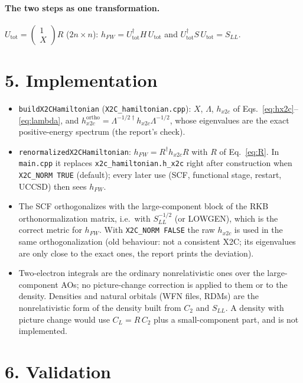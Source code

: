 \documentclass[11pt]{article}
\newcommand{\dg}{^{\dagger}}
\begin{document}
\paragraph{The two steps as one transformation.}
$U_{\text{tot}} = \begin{pmatrix}1\\X\end{pmatrix}R$ ($2n\times n$): $h_{FW}=U_{\text{tot}}\dg H\,U_{\text{tot}}$ and
$U_{\text{tot}}\dg S\,U_{\text{tot}} = S_{LL}$.

\section*{5. Implementation}

\begin{itemize}
\item \texttt{buildX2CHamiltonian} (\texttt{X2C\_hamiltonian.cpp}): $X$, $\Lambda$, $h_{x2c}$ of
Eqs.~\eqref{eq:hx2c}--\eqref{eq:lambda}, and $h^{\text{ortho}}_{x2c}=\Lambda^{-1/2\dagger}h_{x2c}\Lambda^{-1/2}$, whose
eigenvalues are the exact positive-energy spectrum (the report's check).
\item \texttt{renormalizedX2CHamiltonian}: $h_{FW}=R\dg h_{x2c}R$ with $R$ of Eq.~\eqref{eq:R}. In \texttt{main.cpp} it
replaces \texttt{x2c\_hamiltonian.h\_x2c} right after construction when \texttt{X2C\_NORM TRUE} (default); every later
use (SCF, functional stage, restart, UCCSD) then sees $h_{FW}$.
\item The SCF orthogonalizes with the large-component block of the RKB orthonormalization matrix, i.e.\ with
$S_{LL}^{-1/2}$ (or LOWGEN), which is the correct metric for $h_{FW}$. With \texttt{X2C\_NORM FALSE} the raw $h_{x2c}$ is used
in the same orthogonalization (old behaviour: not a consistent X2C; its eigenvalues are only close to the exact ones,
the report prints the deviation).
\item Two-electron integrals are the ordinary nonrelativistic ones over the large-component AOs; no picture-change
correction is applied to them or to the density. Densities and natural orbitals (WFN files, RDMs) are the
nonrelativistic form of the density built from $C_2$ and $S_{LL}$. A density with picture change would use
$C_L=R\,C_2$ plus a small-component part, and is not implemented.
\end{itemize}

\section*{6. Validation}
\end{document}
